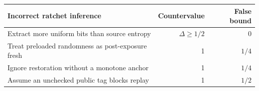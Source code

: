 \begin{tabular}{p{9.5cm}rr}
\toprule
Incorrect ratchet inference & Countervalue & False bound \\
\midrule
Extract more uniform bits than source entropy & $\Delta\ge1/2$ & 0 \\
Treat preloaded randomness as post-exposure fresh & 1 & $1/4$ \\
Ignore restoration without a monotone anchor & 1 & $1/4$ \\
Assume an unchecked public tag blocks replay & 1 & $1/2$ \\
\bottomrule
\end{tabular}
